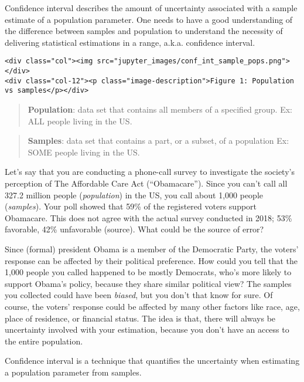 \documentclass[11pt]{article}
\begin{document}
Confidence interval describes the amount of uncertainty associated with
a sample estimate of a population parameter. One needs to have a good
understanding of the difference between samples and population to
understand the necessity of delivering statistical estimations in a
range, a.k.a. confidence interval.

\hypertarget{fig1}{}
\begin{verbatim}
<div class="col"><img src="jupyter_images/conf_int_sample_pops.png"></div>
<div class="col-12"><p class="image-description">Figure 1: Population vs samples</p></div>
\end{verbatim}

\begin{quote}
\textbf{Population}: data set that contains all members of a specified
group. Ex: ALL people living in the US.
\end{quote}

\begin{quote}
\textbf{Samples}: data set that contains a part, or a subset, of a
population Ex: SOME people living in the US.
\end{quote}

Let's say that you are conducting a phone-call survey to investigate the
society's perception of The Affordable Care Act (``Obamacare''). Since
you can't call all 327.2 million people (\emph{population}) in the US,
you call about 1,000 people (\emph{samples}). Your poll showed that 59\%
of the registered voters support Obamacare. This does not agree with the
actual survey conducted in 2018; 53\% favorable, 42\% unfavorable
(source). What could be the source of error?

Since (formal) president Obama is a member of the Democratic Party, the
voters' response can be affected by their political preference. How
could you tell that the 1,000 people you called happened to be mostly
Democrats, who's more likely to support Obama's policy, because they
share similar political view? The samples you collected could have been
\emph{biased}, but you don't that know for sure. Of course, the voters'
response could be affected by many other factors like race, age, place
of residence, or financial status. The idea is that, there will always
be uncertainty involved with your estimation, because you don't have an
access to the entire population.

Confidence interval is a technique that quantifies the uncertainty when
estimating a population parameter from samples.

\hypertarget{sample_pop_var}{}
\end{document}
